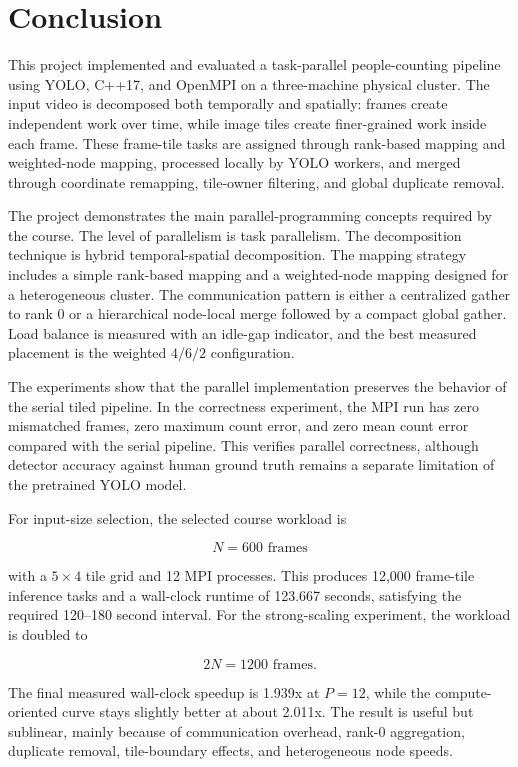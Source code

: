 \chapter{Conclusion}

This project implemented and evaluated a task-parallel people-counting pipeline using YOLO, C++17, and OpenMPI on a three-machine physical cluster. The input video is decomposed both temporally and spatially: frames create independent work over time, while image tiles create finer-grained work inside each frame. These frame-tile tasks are assigned through rank-based mapping and weighted-node mapping, processed locally by YOLO workers, and merged through coordinate remapping, tile-owner filtering, and global duplicate removal.

The project demonstrates the main parallel-programming concepts required by the course. The level of parallelism is task parallelism. The decomposition technique is hybrid temporal-spatial decomposition. The mapping strategy includes a simple rank-based mapping and a weighted-node mapping designed for a heterogeneous cluster. The communication pattern is either a centralized gather to rank 0 or a hierarchical node-local merge followed by a compact global gather. Load balance is measured with an idle-gap indicator, and the best measured placement is the weighted $4/6/2$ configuration.

The experiments show that the parallel implementation preserves the behavior of the serial tiled pipeline. In the correctness experiment, the MPI run has zero mismatched frames, zero maximum count error, and zero mean count error compared with the serial pipeline. This verifies parallel correctness, although detector accuracy against human ground truth remains a separate limitation of the pretrained YOLO model.

For input-size selection, the selected course workload is

\[
N = 600 \text{ frames}
\]

with a $5 \times 4$ tile grid and 12 MPI processes. This produces 12,000 frame-tile inference tasks and a wall-clock runtime of 123.667 seconds, satisfying the required 120--180 second interval. For the strong-scaling experiment, the workload is doubled to

\[
2N = 1200 \text{ frames}.
\]

The final measured wall-clock speedup is 1.939x at $P = 12$, while the compute-oriented curve stays slightly better at about 2.011x. The result is useful but sublinear, mainly because of communication overhead, rank-0 aggregation, duplicate removal, tile-boundary effects, and heterogeneous node speeds.

